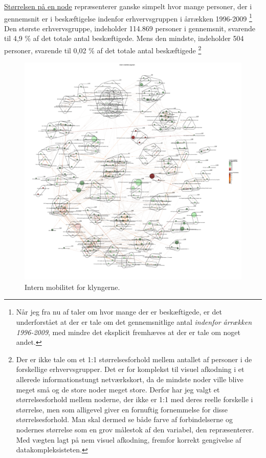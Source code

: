 \underline{Størrelsen på en node} repræsenterer ganske simpelt hvor mange personer, der i gennemsnit er i beskæftigelse indenfor erhvervsgruppen i årrækken 1996-2009%
%
\footnote{Når jeg fra nu af taler om hvor mange der er beskæftigede, er det underforstået at der er tale om det gennemsnitlige antal \emph{indenfor årrækken 1996-2009}, med mindre det eksplicit fremhæves at der er tale om noget andet.}%
%
Den største erhvervsgruppe,  indeholder 114.869 personer i gennemsnit, svarende til 4,9 \% af det totale antal beskæftigede. Mens den mindste,  indeholder 504 personer, svarende til 0,02 \% af det totale antal beskæftigede
%
\footnote{Der er ikke tale om et 1:1 størrelsesforhold mellem antallet af personer i de forskellige erhvervsgrupper. Det er for komplekst til visuel afkodning i et allerede informationstungt netværkskort, da de mindste noder ville blive meget små og de store noder meget store. Derfor har jeg valgt et størrelsesforhold mellem noderne, der ikke er 1:1 med deres reelle forskelle i størrelse, men som alligevel giver en fornuftig fornemmelse for disse størrelsesforhold. Man skal dermed se både farve af forbindelserne og nodernes størrelse som en grov målestok af den variabel, den repræsenterer. Med vægten lagt på nem visuel afkodning, fremfor korrekt gengivelse af datakompleksisteten.}%

\begin{figure}[H]
\begin{center}
	\caption{Intern mobilitet for klyngerne.}
	\label{fig_analyse_deskriptivt_kort_intern_mob_seg}
	\includegraphics[width=1.0\textwidth]{fig/netvaerkskort/kort_intern_mob_seg.pdf}
\end{center}
\end{figure}
\restoregeometry


